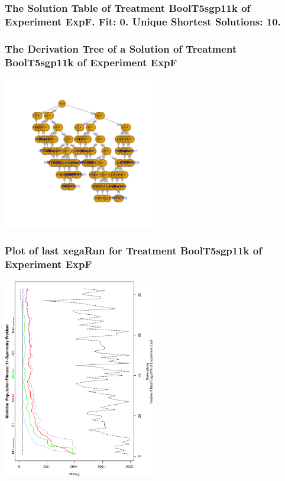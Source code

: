 \documentclass[18pt,c]{beamer}
\begin{document}
 \begin{frame}
 \fontsize{8pt}{9pt}\selectfont
 \frametitle{ The Solution Table of Treatment BoolT5sgp11k of Experiment ExpF. Fit: 0. Unique Shortest Solutions: 10. }

 \label{ExpFSolutionTable001.tex}  
 \end{frame}

 \begin{frame}
 \frametitle{ The Derivation Tree of a Solution of Treatment BoolT5sgp11k of Experiment ExpF }
 \begin{center}
\includegraphics[width=0.5\textwidth, angle=0]
{ExpFDerivationTreeFigure001.pdf}
 \end{center}
 \label{report/ExpFDerivationTreeFigure001.pdf}  
 \end{frame}

 \begin{frame}
 \frametitle{ Plot of last xegaRun for Treatment BoolT5sgp11k of Experiment ExpF }
 \begin{center}
\includegraphics[width=0.5\textwidth, angle=-90]
{ExpFPlotPopStatsFigure001.eps}
 \end{center}
 \label{report/ExpFPlotPopStatsFigure001.eps}  
 \end{frame}
\end{document}
